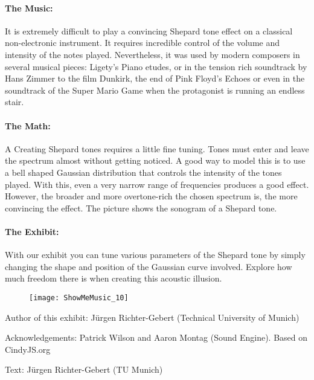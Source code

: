 \paragraph{The Music:} It is extremely difficult to play a convincing Shepard tone effect on a classical non-electronic instrument. It requires incredible control of the volume and intensity of the notes played. Nevertheless, it was used by modern composers in several musical pieces: Ligety's Piano etudes, or in the tension rich soundtrack by Hans Zimmer to the film Dunkirk, the end of Pink Floyd's Echoes or even in the soundtrack of the Super Mario Game when the protagonist is running an endless stair.

\paragraph{The Math:} A Creating Shepard tones requires a little fine tuning. Tones must enter and leave the spectrum almost without getting noticed. A good way to model this is to use a bell shaped Gaussian distribution that controls the intensity of the tones played. With this, even a very narrow range of frequencies produces a good effect. However, the broader and more overtone-rich the chosen spectrum is, the more convincing the effect. The picture shows the sonogram of a Shepard tone.

\paragraph{The Exhibit:} With our exhibit you can tune various parameters of the Shepard tone by simply changing the shape and position of the Gaussian curve involved. Explore how much freedom there is when creating this acoustic illusion.

\begin{figure}[h]
\centering
\texttt{[image: ShowMeMusic\_10]}
\end{figure}
\strut
\vspace{6em}

\begin{sectcredits}
\item[Author of this exhibit:] Jürgen Richter-Gebert (Technical University of Munich)
\item[Acknowledgements:] Patrick Wilson and Aaron Montag (Sound Engine). Based on CindyJS.org
\item[Text:] Jürgen Richter-Gebert (TU Munich)
\end{sectcredits}
